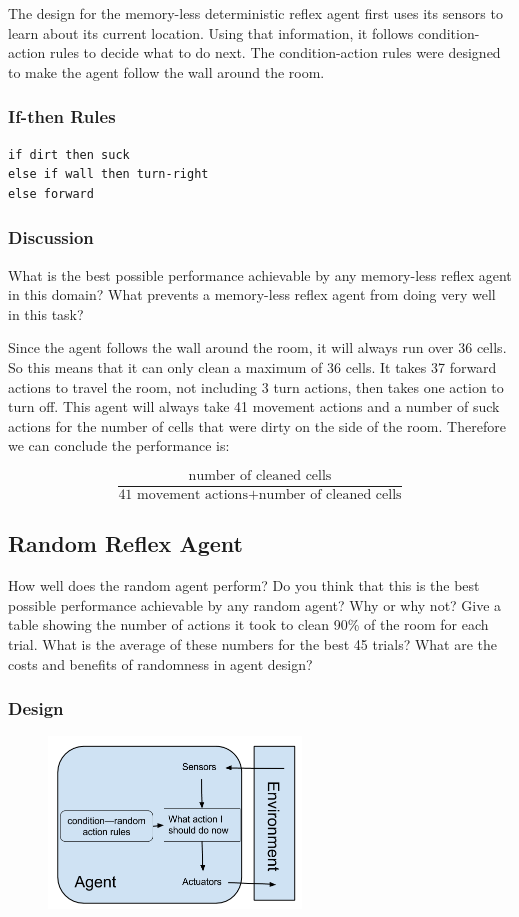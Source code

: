 \documentclass[a4paper,10pt]{article}
\begin{document}
The design for the memory-less deterministic reflex agent first uses its sensors to learn about its current location. Using that information, it follows condition-action rules to decide what to do next. The condition-action rules were designed to make the agent follow the wall around the room.

\subsubsection{If-then Rules}
\begin{verbatim}
if dirt then suck
else if wall then turn-right
else forward
\end{verbatim}

\subsubsection{Discussion}
What is the best possible performance achievable by any memory-less reflex agent in this domain? What prevents a memory-less reflex agent from doing very well in this task?

Since the agent follows the wall around the room, it will always run over 36 cells. 
So this means that it can only clean a maximum of 36 cells. 
It takes 37 forward actions to travel the room, not including 3 turn actions, then takes one action to turn off. 
This agent will always take 41 movement actions and a number of suck actions for the number of cells that were dirty on the side of the room. 
Therefore we can conclude the performance is:

\[\frac{\mbox{number of cleaned cells}}{\mbox{41 movement actions} + \mbox{number of cleaned cells}}\] 




\subsection{Random Reflex Agent}
How well does the random agent perform? Do you think that this is the best possible performance achievable by any random agent? Why or why not? Give a table showing the number of actions it took to clean 90\% of the room for each trial. What is the average of these numbers for the best 45 trials? What are the costs and benefits of randomness in agent design?
\subsubsection{Design}
\begin{figure}[H]
	\begin{center}
		\includegraphics[width=0.6\textwidth]{RandomReflex.png}
	\end{center}
\end{figure}
\end{document}
